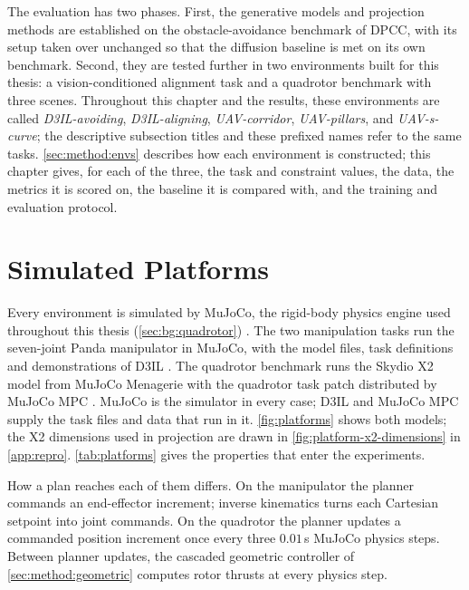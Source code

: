 The evaluation has two phases. First, the generative models and projection methods are established on
the obstacle-avoidance benchmark of \ac{DPCC}, with its setup taken over unchanged so that the diffusion
baseline is met on its own benchmark. Second, they are tested further in two environments built for
this thesis: a vision-conditioned alignment task and a quadrotor benchmark with three scenes.
Throughout this chapter and the results, these environments are called \emph{D3IL-avoiding},
\emph{D3IL-aligning}, \emph{UAV-corridor}, \emph{UAV-pillars}, and \emph{UAV-s-curve}; the descriptive
subsection titles and these prefixed names refer to the same tasks. \autoref{sec:method:envs} describes how each environment is constructed; this
chapter gives, for each of the three, the task and constraint values, the data, the metrics it is scored
on, the baseline it is compared with, and the training and evaluation protocol.

\section{Simulated Platforms}\label{sec:setup:platforms}

Every environment is simulated by MuJoCo, the rigid-body physics engine used throughout this thesis
(\autoref{sec:bg:quadrotor}) \parencite{todorov2012mujoco}. The two
manipulation tasks run the seven-joint Panda manipulator in MuJoCo, with the model files, task
definitions and demonstrations of D3IL \parencite{jia2024towards}. The quadrotor benchmark runs the Skydio X2 model from MuJoCo Menagerie
\parencite{zakka2022menagerie} with the quadrotor task patch distributed by MuJoCo MPC
\parencite{howell2022predictive}. MuJoCo is the simulator in every case; D3IL and MuJoCo MPC supply the
task files and data that run in it. \autoref{fig:platforms} shows both models; the X2 dimensions used
in projection are drawn in \autoref{fig:platform-x2-dimensions} in \autoref{app:repro}.
\autoref{tab:platforms} gives the properties that enter the experiments.

How a plan reaches each of them differs. On the manipulator the planner commands an end-effector
increment; inverse kinematics turns each Cartesian setpoint into joint commands. On the quadrotor the
planner updates a commanded position increment once every three $0.01$\,s MuJoCo physics steps.
Between planner updates, the cascaded geometric controller of \autoref{sec:method:geometric}
computes rotor thrusts at every physics step.

